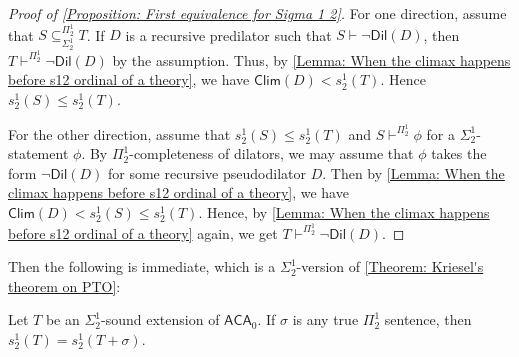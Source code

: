 \documentclass{mhkr}
\newcommand{\added}[1]{#1}
\newcommand{\Clim}{\mathsf{Clim}}
\newcommand{\Dil}{\mathsf{Dil}}
\newcommand{\ACA}{\mathsf{ACA}}
\begin{document}
\begin{proof}[Proof of \autoref{Proposition: First equivalence for Sigma 1 2}]
    For one direction, assume that $S\subseteq^{\Pi^1_2}_{\Sigma^1_2} T$.
    If $D$ is a recursive predilator such that $S\vdash\lnot\Dil(D)$, then $T\vdash^{\Pi^1_2}\lnot\Dil(D)$ by the assumption. Thus, by \autoref{Lemma: When the climax happens before s12 ordinal of a theory}, we have $\Clim(D)<s^1_2(T)$. Hence $s^1_2(S)\le s^1_2(T)$.

    For the other direction, assume that $s^1_2(S)\le s^1_2(T)$ and $S\vdash^{\Pi^1_2} \phi$ for a $\Sigma^1_2$-statement $\phi$. By $\Pi^1_2$-completeness of dilators, we may assume that $\phi$ takes the form $\lnot\Dil(D)$ for some recursive \added{pseudo}dilator $D$.
    Then by \autoref{Lemma: When the climax happens before s12 ordinal of a theory}, we have $\Clim(D) < s^1_2(S) \le s^1_2(T)$. Hence, by \autoref{Lemma: When the climax happens before s12 ordinal of a theory} again, we get $T\vdash^{\Pi^1_2} \lnot\Dil(D)$.
\end{proof}

Then the following is immediate, which is a \added{$\Sigma^1_2$-version of \autoref{Theorem: Kriesel's theorem on PTO}}:
\begin{corollary} \pushQED{\qed} \label{Corollary: s 1 2 is stable under true Pi 1 2}
    Let $T$ be an $\Sigma^1_2$-sound extension of $\ACA_0$. If $\sigma$ is any true $\Pi^1_2$ sentence, then $s^1_2(T)=s^1_2(T+\sigma)$. \qedhere
\end{corollary}
\end{document}
